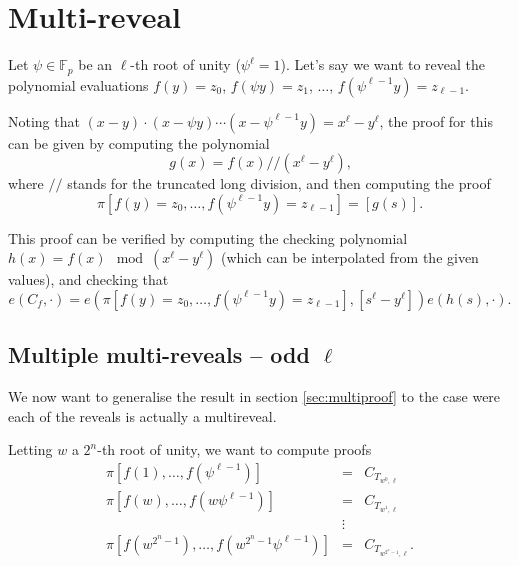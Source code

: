 \documentclass[a4paper]{article}
\begin{document}
\section{Multi-reveal}

Let $\psi\in\mathbb{F}_p$ be an $\ell$-th root of unity ($\psi^\ell=1$). Let's say we want to reveal the polynomial evaluations $f(y) = z_0$, $f(\psi y) = z_1$, $\ldots$, $f(\psi^{\ell-1} y)=z_{\ell - 1}$.

Noting that $(x-y)\cdot(x-\psi y) \cdots (x - \psi^{\ell-1} y) = x^\ell - y^\ell$, the proof for this can be given by computing the polynomial
\begin{equation}
g(x) = f(x) // (x^\ell - y^\ell)\text{,}
\end{equation}
where $//$ stands for the truncated long division, and then computing the proof
\begin{equation}
     \pi[f(y) = z_0, \ldots, f(\psi^{\ell-1}y)=z_{\ell - 1}] = [g(s)] \text{.}
\end{equation}

This proof can be verified by computing the checking polynomial $h(x) = f(x) \mod (x^\ell - y^\ell)$ (which can be interpolated from the given values), and checking that
\begin{equation}
e(C_f, \cdot) = e(\pi[f(y) = z_0, \ldots, f(\psi^{\ell-1}y)=z_{\ell - 1}], [s^\ell - y^\ell]) e(h(s),\cdot) \text{.}
\end{equation}

\subsection{Multiple multi-reveals -- odd $\ell$}

We now want to generalise the result in section \ref{sec:multiproof} to the case were each of the reveals is actually a multireveal.

Letting $w$ a $2^n$-th root of unity, we want to compute proofs
\begin{eqnarray}
     \pi[f(1), \ldots, f(\psi^{\ell-1})] &=& C_{T_{w^0, \ell}} \\
     \pi[f(w), \ldots, f(w\psi^{\ell-1})] &=& C_{T_{w^1, \ell}} \\
     &\vdots& \nonumber \\
     \pi[f(w^{2^n-1}), \ldots, f(w^{2^n-1}\psi^{\ell-1})] &=& C_{T_{w^{2^n-1}, \ell}} \text{.}
\end{eqnarray}
\end{document}
